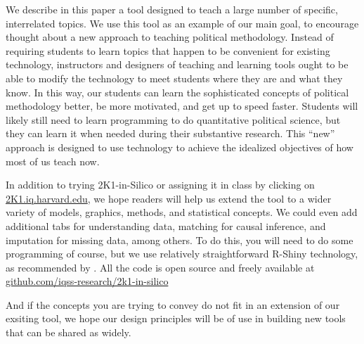 \documentclass[12pt]{article}
\theoremstyle{definition}
\begin{document}
We describe in this paper a tool designed to teach a large number of specific, interrelated topics.  We use this tool as an example of our main goal, to encourage thought about a new approach to teaching political methodology. Instead of requiring students to learn topics that happen to be convenient for existing technology, instructors and designers of teaching and learning tools ought to be able to modify the technology to meet students where they are and what they know. In this way, our students can learn the sophisticated concepts of political methodology better, be more motivated, and get up to speed faster. Students will likely still need to learn programming to do quantitative political science, but they can learn it when needed during their substantive research. This ``new'' approach is designed to use technology to achieve the idealized objectives of how most of us teach now.

In addition to trying 2K1-in-Silico or assigning it in class by clicking on \href{https://2k1.iq.harvard.edu}{2K1.iq.harvard.edu}, we hope readers will help us extend the tool to a wider variety of models, graphics, methods, and statistical concepts. We could even add additional tabs for understanding data, matching for causal inference, and imputation for missing data, among others. To do this, you will need to do some programming of course, but we use relatively straightforward R-Shiny technology, as recommended by \citet{Metzger2022}. All the code is open source and freely available at \href{https://github.com/iqss-research/2k1-in-silico}{github.com/iqss-research/2k1-in-silico}

And if the concepts you are trying to convey do not fit in an extension of our exsiting tool, we hope our design principles will be of use in building new tools that can be shared as widely.


\singlespace
\printbibliography
\end{document}
